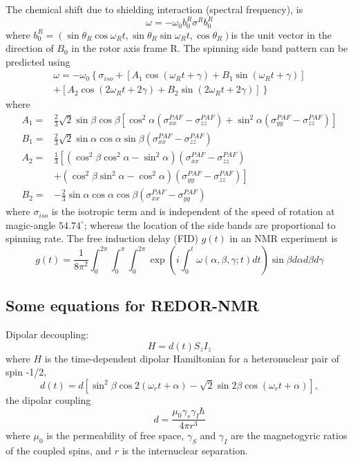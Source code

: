 \documentclass[12pt]{book}
\begin{document}
The chemical shift due to shielding interaction (spectral frequency), is 
\[
\omega=-\omega_{0}b_{0}^{R}\sigma^{R}b_{0}^{R}
\]
where $b_{0}^{R}=\left(\sin\theta_{R}\cos\omega_{R}t,\sin\theta_{R}\sin\omega_{R}t,\cos\theta_{R}\right)$is the unit vector in the direction of $B_{0}$ in the rotor axis frame R. The spinning side band pattern can be predicted using 
\begin{multline*}
\omega=-\omega_{0}\left\{ \sigma_{iso}+\left[A_{1}\cos\left(\omega_{R}t+\gamma\right)+B_{1}\sin\left(\omega_{R}t+\gamma\right)\right]\right.\\
\left.+\left[A_{2}\cos\left(2\omega_{R}t+2\gamma\right)+B_{2}\sin\left(2\omega_{R}t+2\gamma\right)\right]\right\} 
\end{multline*}
where
\begin{align*}
A_{1}= & \frac{2}{3}\sqrt{2}\sin\beta\cos\beta\left[\cos^{2}\alpha\left(\sigma_{xx}^{PAF}-\sigma_{zz}^{PAF}\right)+\sin^{2}\alpha\left(\sigma_{yy}^{PAF}-\sigma_{zz}^{PAF}\right)\right]\\
B_{1}= & \frac{2}{3}\sqrt{2}\sin\alpha\cos\alpha\sin\beta\left(\sigma_{xx}^{PAF}-\sigma_{zz}^{PAF}\right)\\
A_{2}= & \frac{1}{3}\left[\left(\cos^{2}\beta\cos^{2}\alpha-\sin^{2}\alpha\right)\left(\sigma_{xx}^{PAF}-\sigma_{zz}^{PAF}\right)\right.\\
& +\left.\left(\cos^{2}\beta\sin^{2}\alpha-\cos^{2}\alpha\right)\left(\sigma_{yy}^{PAF}-\sigma_{zz}^{PAF}\right)\right]\\
B_{2}= & -\frac{2}{3}\sin\alpha\cos\alpha\cos\beta\left(\sigma_{xx}^{PAF}-\sigma_{yy}^{PAF}\right)
\end{align*}
where $\sigma_{iso}$ is the isotropic term and is independent of the speed of rotation at magic-angle $54.74^{\circ}$; whereas the location of the side bands are proportional to spinning rate. The
free induction delay (FID) $g\left(t\right)$ in an NMR experiment is 
\[
g\left(t\right)=\frac{1}{8\pi^{2}}\int_{0}^{2\pi}\int_{0}^{\pi}\int_{0}^{2\pi}\exp\left(i\int_{0}^{t}\omega\left(\alpha,\beta,\gamma;t\right)dt\right)\sin\beta d\alpha d\beta d\gamma
\]
\subsection{Some equations for REDOR-NMR}
Dipolar decoupling: 
\[
H=d\left(t\right)S_{z}I_{z}
\]
where $H$ is the time-dependent dipolar Hamiltonian for a heteronuclear
pair of spin -1/2, 
\[
d\left(t\right)=d\left[\sin^{2}\beta\cos2\left(\omega_{r}t+\alpha\right)-\sqrt{2}\sin2\beta\cos\left(\omega_{r}t+\alpha\right)\right],
\]
the dipolar coupling 
\[
d=\frac{\mu_{0}\gamma_{s}\gamma_{I}\hbar}{4\pi r^{3}}
\]
where $\mu_{0}$ is the permeability of free space, $\gamma_{S}$ and $\gamma_{I}$ are the magnetogyric ratios of the coupled spins, and $r$ is the internuclear separation. 
\end{document}
